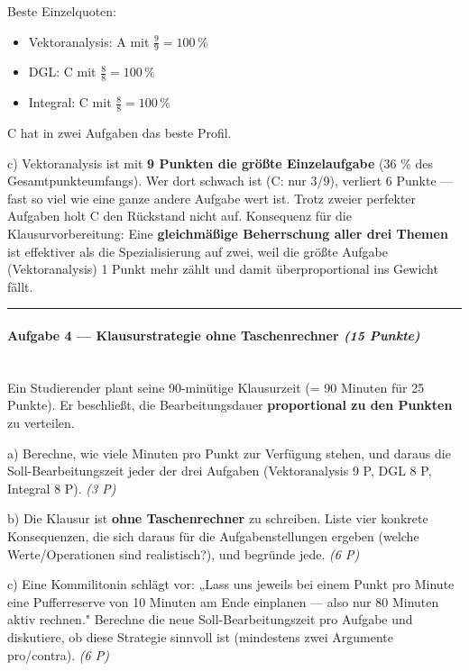 \documentclass[11pt, a4paper]{article}
\begin{document}
Beste Einzelquoten:

\begin{itemize}
  \item Vektoranalysis: A mit $\frac{9}{9} = 100\,\%$
  \item DGL: C mit $\frac{8}{8} = 100\,\%$
  \item Integral: C mit $\frac{8}{8} = 100\,\%$
\end{itemize}

C hat in zwei Aufgaben das beste Profil.


c) Vektoranalysis ist mit \textbf{9 Punkten die größte Einzelaufgabe} (36 \% des Gesamtpunkteumfangs). Wer dort schwach ist (C: nur 3/9), verliert 6 Punkte — fast so viel wie eine ganze andere Aufgabe wert ist. Trotz zweier perfekter Aufgaben holt C den Rückstand nicht auf. Konsequenz für die Klausurvorbereitung: Eine \textbf{gleichmäßige Beherrschung aller drei Themen} ist effektiver als die Spezialisierung auf zwei, weil die größte Aufgabe (Vektoranalysis) 1 Punkt mehr zählt und damit überproportional ins Gewicht fällt.



\noindent\textcolor{rulegray}{\rule{\linewidth}{0.4pt}}


\paragraph{Aufgabe 4 — Klausurstrategie ohne Taschenrechner \textit{(15 Punkte)}}\mbox{}\\[2pt]

Ein Studierender plant seine 90-minütige Klausurzeit (= 90 Minuten für 25 Punkte). Er beschließt, die Bearbeitungsdauer \textbf{proportional zu den Punkten} zu verteilen.


a) Berechne, wie viele Minuten pro Punkt zur Verfügung stehen, und daraus die Soll-Bearbeitungszeit jeder der drei Aufgaben (Vektoranalysis 9 P, DGL 8 P, Integral 8 P). \textit{(3 P)}


b) Die Klausur ist \textbf{ohne Taschenrechner} zu schreiben. Liste vier konkrete Konsequenzen, die sich daraus für die Aufgabenstellungen ergeben (welche Werte/Operationen sind realistisch?), und begründe jede. \textit{(6 P)}


c) Eine Kommilitonin schlägt vor: „Lass uns jeweils bei einem Punkt pro Minute eine Pufferreserve von 10 Minuten am Ende einplanen — also nur 80 Minuten aktiv rechnen." Berechne die neue Soll-Bearbeitungszeit pro Aufgabe und diskutiere, ob diese Strategie sinnvoll ist (mindestens zwei Argumente pro/contra). \textit{(6 P)}
\end{document}
